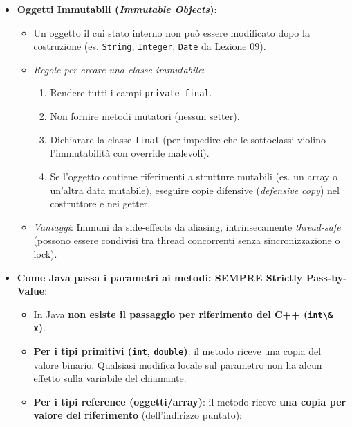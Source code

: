 \documentclass[11pt,a4paper]{article}
\newcommand{\passthrough}[1]{#1}
\providecommand{\tightlist}{\setlength{\itemsep}{0pt}\setlength{\parskip}{0pt}}
\begin{document}
\begin{itemize}
\tightlist
\item
  \textbf{Oggetti Immutabili (\emph{Immutable Objects})}:

  \begin{itemize}
  \tightlist
  \item
    Un oggetto il cui stato interno non può essere modificato dopo la
    costruzione (es. \passthrough{\lstinline!String!},
    \passthrough{\lstinline!Integer!}, \passthrough{\lstinline!Date!} da
    Lezione 09).
  \item
    \emph{Regole per creare una classe immutabile}:

    \begin{enumerate}
    \def\labelenumi{\arabic{enumi}.}
    \tightlist
    \item
      Rendere tutti i campi \passthrough{\lstinline!private final!}.
    \item
      Non fornire metodi mutatori (nessun setter).
    \item
      Dichiarare la classe \passthrough{\lstinline!final!} (per impedire
      che le sottoclassi violino l'immutabilità con override malevoli).
    \item
      Se l'oggetto contiene riferimenti a strutture mutabili (es. un
      array o un'altra data mutabile), eseguire copie difensive
      (\emph{defensive copy}) nel costruttore e nei getter.
    \end{enumerate}
  \item
    \emph{Vantaggi}: Immuni da side-effects da aliasing, intrinsecamente
    \emph{thread-safe} (possono essere condivisi tra thread concorrenti
    senza sincronizzazione o lock).
  \end{itemize}
\item
  \textbf{Come Java passa i parametri ai metodi: SEMPRE Strictly
  Pass-by-Value}:

  \begin{itemize}
  \tightlist
  \item
    In Java \textbf{non esiste il passaggio per riferimento del C++
    (\passthrough{\lstinline!int\& x!})}.
  \item
    \textbf{Per i tipi primitivi (\passthrough{\lstinline!int!},
    \passthrough{\lstinline!double!})}: il metodo riceve una copia del
    valore binario. Qualsiasi modifica locale sul parametro non ha alcun
    effetto sulla variabile del chiamante.
  \item
    \textbf{Per i tipi reference (oggetti/array)}: il metodo riceve
    \textbf{una copia per valore del riferimento} (dell'indirizzo
    puntato):


\end{itemize}
\end{itemize}
\end{document}
